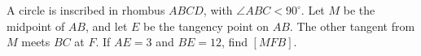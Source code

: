 A circle is inscribed in rhombus $ABCD$, with $\angle ABC<90^\circ$. Let $M$ be the midpoint of $AB$, and let $E$ be the tangency point on $AB$. The other tangent from $M$ meets $BC$ at $F$. If $AE=3$ and $BE=12$, find $[MFB]$.
